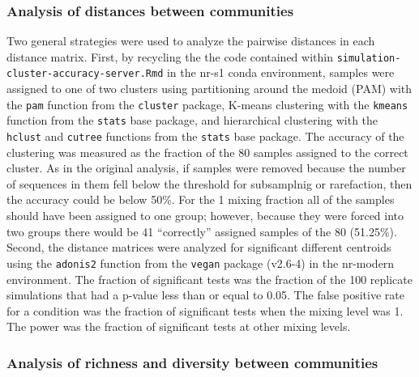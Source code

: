 \documentclass[
]{article}
\begin{document}
\hypertarget{analysis-of-distances-between-communities}{%
\subsubsection{Analysis of distances between
communities}\label{analysis-of-distances-between-communities}}

Two general strategies were used to analyze the pairwise distances in
each distance matrix. First, by recycling the the code contained within
\texttt{simulation-cluster-accuracy-server.Rmd} in the nr-s1 conda
environment, samples were assigned to one of two clusters using
partitioning around the medoid (PAM) with the \texttt{pam} function from
the \texttt{cluster} package, K-means clustering with the
\texttt{kmeans} function from the \texttt{stats} base package, and
hierarchical clustering with the \texttt{hclust} and \texttt{cutree}
functions from the \texttt{stats} base package. The accuracy of the
clustering was measured as the fraction of the 80 samples assigned to
the correct cluster. As in the original analysis, if samples were
removed because the number of sequences in them fell below the threshold
for subsamplnig or rarefaction, then the accuracy could be below 50\%.
For the 1 mixing fraction all of the samples should have been assigned
to one group; however, because they were forced into two groups there
would be 41 ``correctly'' assigned samples of the 80 (51.25\%). Second,
the distance matrices were analyzed for significant different centroids
using the \texttt{adonis2} function from the \texttt{vegan} package
(v2.6-4) in the nr-modern environment. The fraction of significant tests
was the fraction of the 100 replicate simulations that had a p-value
less than or equal to 0.05. The false positive rate for a condition was
the fraction of significant tests when the mixing level was 1. The power
was the fraction of significant tests at other mixing levels.

\hypertarget{analysis-of-richness-and-diversity-between-communities}{%
\subsubsection{Analysis of richness and diversity between
communities}\label{analysis-of-richness-and-diversity-between-communities}}
\end{document}
